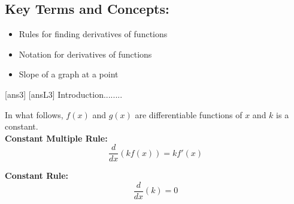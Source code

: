 \begin{framed}
\begin{itemize}
\begin{itemize}
    \end{itemize}
\end{itemize}
\subsection*{Key Terms and Concepts:} 

\begin{multicols}{2}
\begin{itemize}
    \item Rules for finding derivatives of functions
    \item Notation for derivatives of functions
    \item Slope of a graph at a point
\end{itemize}
\end{multicols}
\end{framed}
\newpage
[ans3]
[ansL3]
\noindent Introduction........

\begin{tcolorbox}[title = {Formula Box}]

\noindent In what follows, $f(x)$ and $g(x)$ are differentiable functions of $x$ and $k$ is a constant.\\

\textbf{Constant Multiple Rule:}
\begin{equation}\label{eq:constantMultiple}
\frac{d}{dx}(kf(x))=kf'(x)
\end{equation}

\textbf{Constant Rule:}\footnotemark
\begin{equation}\label{eq:ConstantRule}
\frac{d}{dx}(k)=0
\end{equation}

\end{tcolorbox}

